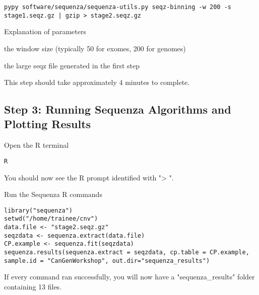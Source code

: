 \begin{steps}
\begin{lstlisting}
pypy software/sequenza/sequenza-utils.py seqz-binning -w 200 -s stage1.seqz.gz | gzip > stage2.seqz.gz
\end{lstlisting}
\end{steps}

\begin{note}
Explanation of parameters
\begin{description}[style=multiline,labelindent=0cm,align=right,leftmargin=\descriptionlabelspace,rightmargin=1.5cm,font=\ttfamily]
 \item[-w] the window size (typically 50 for exomes, 200 for genomes)
 \item[-s] the large seqz file generated in the first step
\end{description}
\end{note}

This step should take approximately 4 minutes to complete.


\subsection{Step 3: Running Sequenza Algorithms and Plotting Results}

\begin{steps}
Open the R terminal
\begin{lstlisting}
R
\end{lstlisting}
\end{steps}

You should now see the R prompt identified with "> ".

\begin{steps}
Run the Sequenza R commands
\begin{lstlisting}
library("sequenza")
setwd("/home/trainee/cnv")
data.file <- "stage2.seqz.gz"
seqzdata <- sequenza.extract(data.file)
CP.example <- sequenza.fit(seqzdata)
sequenza.results(sequenza.extract = seqzdata, cp.table = CP.example, sample.id = "CanGenWorkshop", out.dir="sequenza_results")
\end{lstlisting}
\end{steps}

If every command ran successfully, you will now have a "sequenza\_results" folder containing 13 files.

